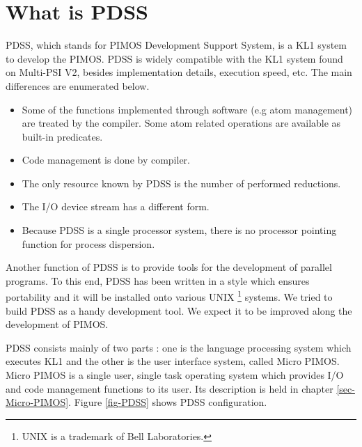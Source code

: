 \section{What is PDSS}
\label{sec-PDSS}
PDSS, which stands for PIMOS Development Support System, is a KL1 system to 
develop the PIMOS.
PDSS is widely compatible with the KL1 system found on Multi-PSI V2,
besides implementation details, execution speed, etc.
The main differences are enumerated below.
\begin{itemize}
\item Some of the functions implemented through software (e.g atom
management) are treated by the compiler. Some atom related operations are
available as built-in predicates.
\item Code management is done by compiler.
\item The only resource known by PDSS is the number of performed reductions.
\item The I/O device stream has a different form.
\item Because PDSS is a single processor system, there is no processor pointing
function for process dispersion.
\end{itemize}

Another function of PDSS is to provide tools for the development of parallel
programs. To this end, PDSS has been written in a style which ensures
portability and it will be installed onto various UNIX
\footnote{UNIX is a trademark of Bell Laboratories.} systems.
We tried to build PDSS as a handy development tool.
We expect it to be improved along the development of PIMOS.

PDSS consists mainly of two parts : one is the language processing system which
executes KL1 and the other is the user interface system, called Micro PIMOS.
Micro PIMOS is a single user, single task operating system which provides I/O
and code management functions to its user. Its description is held in
chapter \ref{sec-Micro-PIMOS}. Figure \ref{fig-PDSS} shows PDSS configuration.

